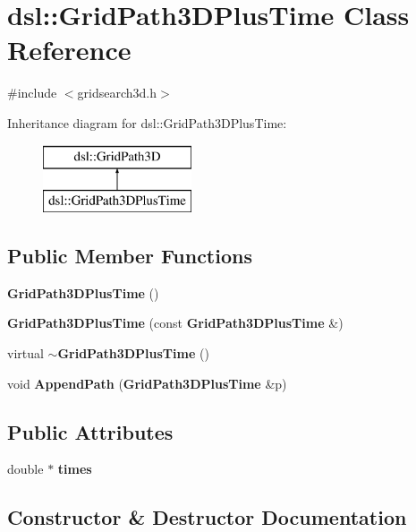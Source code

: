 \section{dsl\-:\-:\-Grid\-Path3\-D\-Plus\-Time \-Class \-Reference}
\label{classdsl_1_1GridPath3DPlusTime}


{\ttfamily \#include $<$gridsearch3d.\-h$>$}

\-Inheritance diagram for dsl\-:\-:\-Grid\-Path3\-D\-Plus\-Time\-:\begin{figure}[H]
\begin{center}
\leavevmode
\includegraphics[height=2.000000cm]{classdsl_1_1GridPath3DPlusTime}
\end{center}
\end{figure}
\subsection*{\-Public \-Member \-Functions}
\begin{DoxyCompactItemize}
\item 
{\bf \-Grid\-Path3\-D\-Plus\-Time} ()
\item 
{\bf \-Grid\-Path3\-D\-Plus\-Time} (const {\bf \-Grid\-Path3\-D\-Plus\-Time} \&)
\item 
virtual {\bf $\sim$\-Grid\-Path3\-D\-Plus\-Time} ()
\item 
void {\bf \-Append\-Path} ({\bf \-Grid\-Path3\-D\-Plus\-Time} \&p)
\end{DoxyCompactItemize}
\subsection*{\-Public \-Attributes}
\begin{DoxyCompactItemize}
\item 
double $\ast$ {\bf times}
\end{DoxyCompactItemize}


\subsection{\-Constructor \& \-Destructor \-Documentation}
